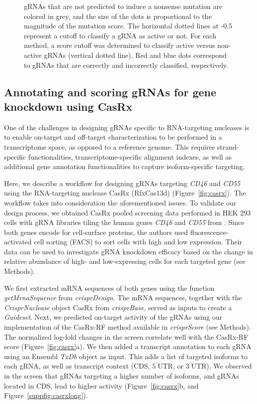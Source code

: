 \documentclass[pdftex,english,10pt]{article}
\begin{document}
\begin{figure}
{ gRNAs that are not predicted to induce a nonsense mutation are colored in grey, and the size of the dots is proportional to the magnitude of the mutation score. The horizontal dotted lines at -0.5 represent a cutoff to classify a gRNA as active or not. For each method, a score cutoff was determined to classify active versus non-active gRNAs (vertical dotted line). Red and blue dots correspond to gRNAs that are correctly and incorrectly classified, respectively. }
  \label{fig:crisprbe}
\end{figure}



\subsection{Annotating and scoring gRNAs for gene knockdown using CasRx}

One of the challenges in designing gRNAs specific to RNA-targeting nucleases is to enable on-target and off-target characterization to be performed in a transcriptome space, as opposed to a reference genome. This requires strand-specific functionalities, transcriptome-specific alignment indexes, as well as additional gene annotation functionalities to capture isoform-specific targeting.  

Here, we describe a workflow for designing gRNAs targeting \textit{CD46} and \textit{CD55} using the RNA-targeting nuclease CasRx (RfxCas13d) \citep{cas13d} (Figure~\ref{fig:casrx}).
The workflow takes into consideration the aforementioned issues. To validate our design process, we obtained CasRx pooled screening data performed in HEK 293 cells with gRNA libraries tiling the human genes \textit{CD46} and \textit{CD55} from \citet{wessels2020massively}. Since both genes encode for cell-surface proteins, the authors used fluorescence-activated cell sorting (FACS) to sort cells with high and low expression. Their data can be used to investigate gRNA knockdown efficacy based on the change in relative abundance of high- and low-expressing cells for each targeted gene (see Methods). 

We first extracted mRNA sequences of both genes using the function \textit{getMrnaSequence} from \textit{crisprDesign}. 
The mRNA sequences, together with the \textit{CrisprNuclease} object CasRx from \textit{crisprBase}, served as inputs to create a \textit{Guideset}.
Next, we predicted on-target activity of the gRNAs using our implementation of the CasRx-RF method \citep{wessels2020massively} available in \textit{crisprScore} (see Methods). The normalized log-fold changes in the screen correlate well with the CasRx-RF score (Figure~\ref{fig:casrx}a). We then added a transcript annotation to each gRNA using an Ensembl \textit{TxDb} object as input. This adds a list of targeted isoforms to each gRNA, as well as transcript context (CDS, $5^{\prime}$UTR, or $3^{\prime}$UTR). We observed in the screen that gRNAs targeting a higher number of isoforms, and gRNAs located in CDS, lead to higher activity (Figure~\ref{fig:casrx}b, and Figure~\ref{suppfig:casrxlong}). 
\end{document}
